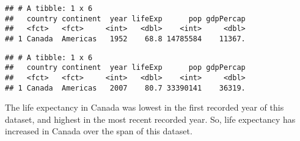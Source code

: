 \documentclass[]{article}
\newenvironment{Shaded}{\begin{snugshade}}{\end{snugshade}}
\newcommand{\KeywordTok}[1]{\textcolor[rgb]{0.13,0.29,0.53}{\textbf{#1}}}
\newcommand{\StringTok}[1]{\textcolor[rgb]{0.31,0.60,0.02}{#1}}
\newcommand{\CommentTok}[1]{\textcolor[rgb]{0.56,0.35,0.01}{\textit{#1}}}
\newcommand{\OperatorTok}[1]{\textcolor[rgb]{0.81,0.36,0.00}{\textbf{#1}}}
\newcommand{\NormalTok}[1]{#1}
\begin{document}
\begin{Shaded}
\end{Shaded}

\begin{verbatim}
## # A tibble: 1 x 6
##   country continent  year lifeExp      pop gdpPercap
##   <fct>   <fct>     <int>   <dbl>    <int>     <dbl>
## 1 Canada  Americas   1952    68.8 14785584    11367.
\end{verbatim}

\begin{Shaded}
\end{Shaded}

\begin{verbatim}
## # A tibble: 1 x 6
##   country continent  year lifeExp      pop gdpPercap
##   <fct>   <fct>     <int>   <dbl>    <int>     <dbl>
## 1 Canada  Americas   2007    80.7 33390141    36319.
\end{verbatim}

The life expectancy in Canada was lowest in the first recorded year of
this dataset, and highest in the most recent recorded year. So, life
expectancy has increased in Canada over the span of this dataset.
\end{document}
